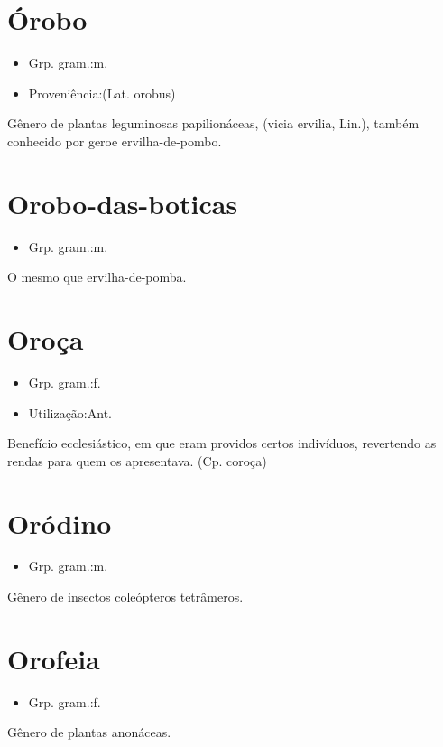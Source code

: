 \section{Órobo}
\begin{itemize}
\item {Grp. gram.:m.}
\end{itemize}
\begin{itemize}
\item {Proveniência:(Lat. \textunderscore orobus\textunderscore )}
\end{itemize}
Gênero de plantas leguminosas papilionáceas, (\textunderscore vicia ervilia\textunderscore , Lin.), também conhecido por \textunderscore gero\textunderscore  e \textunderscore ervilha-de-pombo\textunderscore .
\section{Orobo-das-boticas}
\begin{itemize}
\item {Grp. gram.:m.}
\end{itemize}
O mesmo que \textunderscore ervilha-de-pomba\textunderscore .
\section{Oroça}
\begin{itemize}
\item {Grp. gram.:f.}
\end{itemize}
\begin{itemize}
\item {Utilização:Ant.}
\end{itemize}
Benefício ecclesiástico, em que eram providos certos indivíduos, revertendo as rendas para quem os apresentava.
(Cp. \textunderscore coroça\textunderscore )
\section{Oródino}
\begin{itemize}
\item {Grp. gram.:m.}
\end{itemize}
Gênero de insectos coleópteros tetrâmeros.
\section{Orofeia}
\begin{itemize}
\item {Grp. gram.:f.}
\end{itemize}
Gênero de plantas anonáceas.
